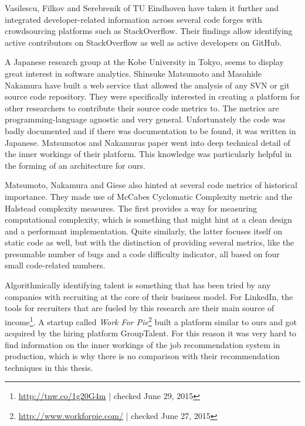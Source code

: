 Vasilescu, Filkov and Serebrenik of TU Eindhoven have taken it further
and integrated developer-related information across several code forges
with crowdsourcing platforms such as StackOverflow\cite{vs:2012}.
Their findings allow identifying active contributors on StackOverflow
as well as active developers on GitHub.
\newline

A Japanese research group at the Kobe University in Tokyo, seems
to display great interest in software analytics\cite{mn:2011}. Shinsuke Matsumoto and Masahide Nakamura
have built a web service that allowed the analysis of any SVN or git source code repository.
They were specifically interested in creating a platform for other researchers to
contribute their source code metrics to. The metrics are programming-language agnostic
and very general. Unfortunately the code was badly documented and if there was documentation
to be found, it was written in Japanese. Matsumotos and Nakamuras paper
went into deep technical detail of the inner workings of their platform.
This knowledge was particularly helpful in the forming of an architecture for ours.

Matsumoto, Nakamura and Giese also hinted at several code metrics of historical
importance. They made use of McCabes Cyclomatic Complexity metric\cite{mc:1976}
and the Halstead complexity measures\cite{h:1977}.
The first provides a way for measuring computational complexity, which is
something that might hint at a clean design and a performant implementation.
Quite similarly, the latter focuses itself on static code as well, but with the
distinction of providing several metrics, like the presumable number of bugs and
a code difficulty indicator, all based on four small code-related numbers.
\newline

Algorithmically identifying talent is something that has been tried by  any companies with recruiting at the core of their business model. For LinkedIn, the tools for recruiters that are fueled by this research are their main source of income\footnote{\url{http://tnw.co/1g20G4m} | checked June 29, 2015}. A startup called \textit{Work For Pie}\footnote{\url{http://www.workforpie.com/} | checked June 27, 2015} built a platform similar to ours and got acquired by the hiring platform GroupTalent. For this reason it was very hard to find information on the inner workings of the job recommendation system in production, which is why there is no comparison with their recommendation techniques in this thesis.

